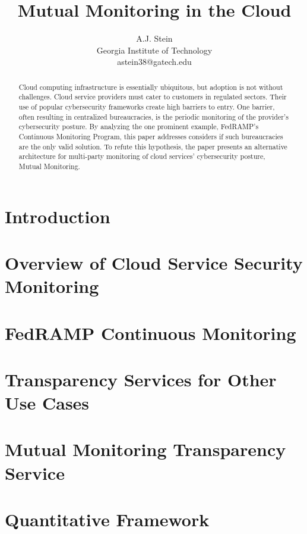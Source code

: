 \documentclass{jdf}
\begin{document}
\title{Mutual Monitoring in the Cloud}
\author{A.J. Stein \\ Georgia Institute of Technology \\ astein38@gatech.edu}

\maketitle
\thispagestyle{fancy}

\begin{abstract}
    Cloud computing infrastructure is essentially ubiquitous, but adoption is not without challenges. Cloud service providers must cater to customers in regulated sectors. Their use of popular cybersecurity frameworks create high barriers to entry. One barrier, often resulting in centralized bureaucracies, is the periodic monitoring of the provider's cybersecurity posture. By analyzing the one prominent example, FedRAMP's Continuous Monitoring Program, this paper addresses considers if such bureaucracies are the only valid solution. To refute this hypothesis, the paper presents an alternative architecture for multi-party monitoring of cloud services' cybersecurity posture, Mutual Monitoring.
\end{abstract}

\section{Introduction}

\section{Overview of Cloud Service Security Monitoring}

\section{FedRAMP Continuous Monitoring}

\section{Transparency Services for Other Use Cases}

\section{Mutual Monitoring Transparency Service}

\section{Quantitative Framework}
\end{document}
